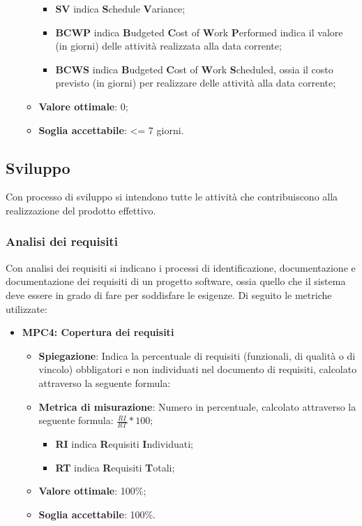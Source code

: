 \begin{itemize}
\begin{itemize}
        \begin{itemize}
            \item \textbf{SV} indica \textbf{S}chedule \textbf{V}ariance;
            \item \textbf{BCWP} indica \textbf{B}udgeted \textbf{C}ost of \textbf{W}ork \textbf{P}erformed indica il valore (in giorni) delle attività realizzata alla data corrente;
            \item \textbf{BCWS} indica \textbf{B}udgeted \textbf{C}ost of \textbf{W}ork \textbf{S}cheduled, ossia il costo previsto (in giorni) per realizzare delle attività alla data corrente;
        \end{itemize}
        \item \textbf{Valore ottimale}: 0;
        \item \textbf{Soglia accettabile}: <= 7 giorni.
    \end{itemize}
\end{itemize}

\subsection{Sviluppo}
Con processo di sviluppo si intendono tutte le attività che contribuiscono alla realizzazione del prodotto effettivo. 

\subsubsection{Analisi dei requisiti} 
Con analisi dei requisiti si indicano i processi di identificazione, documentazione e documentazione dei requisiti di un progetto software, ossia quello che il sistema deve essere in grado di fare per soddisfare le esigenze. Di seguito le metriche utilizzate:
\begin{itemize}
    \item \textbf{MPC4: Copertura dei requisiti}
    \begin{itemize}
        \item \textbf{Spiegazione}: Indica la percentuale di requisiti (funzionali, di qualità o di vincolo) obbligatori e non individuati nel documento di requisiti, calcolato attraverso la seguente formula:
        \item \textbf{Metrica di misurazione}: Numero in percentuale, calcolato attraverso la seguente formula: \textbf{$\frac{RI}{RT} * 100$};
            \begin{itemize}
                \item \textbf{RI} indica \textbf{R}equisiti \textbf{I}ndividuati;
                \item \textbf{RT} indica \textbf{R}equisiti \textbf{T}otali;
            \end{itemize}
        \item \textbf{Valore ottimale}: 100\%;
        \item \textbf{Soglia accettabile}: 100\%.
    \end{itemize}
\end{itemize}


